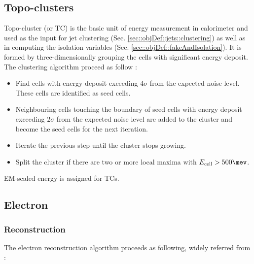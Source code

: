 \subsection{Topo-clusters} \label{sec::objDef::TopoCluster}
Topo-cluster (or TC) is the basic unit of energy measurement in calorimeter and used as the input for jet clustering  (Sec. \ref{sec::objDef::jets::clustering}) as well as in computing the isolation variables (Sec. \ref{sec::objDef::fakeAndIsolation}). 
It is formed by three-dimensionally grouping the cells with significant energy deposit.
The clustering algorithm proceed as follow \cite{138_topoClustering_Run1}:
\begin{itemize}
\item Find cells with energy deposit exceeding $4\sigma$ from the expected noise level. These cells are identified as seed cells.
\item Neighbouring cells touching the boundary of seed cells with energy deposit exceeding $2\sigma$ from the expected noise level are added to the cluster and become the seed cells for the next iteration.
\item Iterate the previous step until the cluster stops growing.
\item Split the cluster if there are two or more local maxima with $E_{\mathrm{cell}}>500\mev$.
\end{itemize}
EM-scaled energy is assigned for TCs. \\




\subsection{Electron} \label{sec::objDef::electrons}

\subsubsection{Reconstruction} \label{sec::objDef::electrons::reco}
The electron reconstruction algorithm proceeds as following, widely referred from \cite{156_ElectronEffMeas_2015data}: 


